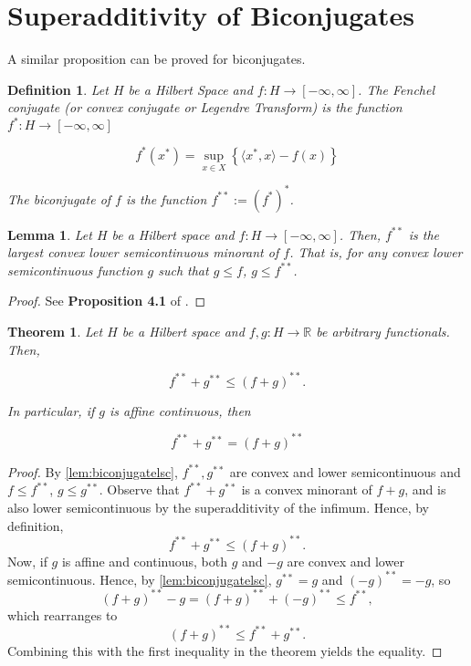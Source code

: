 \documentclass[11pt]{article}
\newtheorem{definition}{Definition}
\newtheorem{theorem}{Theorem}
\newtheorem{lemma}{Lemma}
\newcommand{\R}{\mathbb{R}}
\begin{document}
	
	\section{Superadditivity of Biconjugates}
	A similar proposition can be proved for biconjugates. 
	\begin{definition}
		Let $H$ be a Hilbert Space and $f:H\to[-\infty, \infty]$. The Fenchel conjugate (or convex conjugate or Legendre Transform) is the function $f^{*}:H\to[-\infty, \infty]$
		
		\[	f^{*}(x^*) = \sup_{x\in X} \left\{		\langle x^{*}, x\rangle - f(x)
													\right\}
				\]
		
		\noindent The biconjugate of $f$ is the function $f^{**} := (f^*)^*$.
		\end{definition}
	
	\begin{lemma}
		\label{lem:biconjugatelsc}
		Let $H$ be a Hilbert space and $f:H\to[-\infty, \infty]$. Then, $f^{**}$ is the largest convex lower semicontinuous minorant of $f$. That is, for any convex lower semicontinuous function $g$ such that $g\leq f$, $g\leq f^{**}$.
		\end{lemma}
	
	\begin{proof}
		See \textbf{Proposition 4.1} of \cite{Ekeland}.
		\end{proof}
	
	\begin{theorem}
		Let $H$ be a Hilbert space and $f,g:H\to\R$ be arbitrary functionals. Then, 
		
		\[	f^{**} + g^{**} \leq (f+g)^{**}.
		\]
		
		\noindent In particular, if $g$ is affine continuous, then 
		
		\[	f^{**} + g^{**} = (f+g)^{**}
		\]
	\end{theorem}
	
	\begin{proof}
		By \autoref{lem:biconjugatelsc}, $f^{**}, g^{**}$ are convex and lower semicontinuous and $f\leq f^{**}$, $g\leq g^{**}$. Observe that $f^{**} + g^{**}$ is a convex minorant of $f + g$, and is also lower semicontinuous by the superadditivity of the infimum. Hence, by definition, 
		\[	f^{**} + g^{**} \leq (f+g)^{**}.
				\]
		Now, if $g$ is affine and continuous, both $g$ and $-g$ are convex and lower semicontinuous. Hence, by \autoref{lem:biconjugatelsc}, $g^{**} = g$ and $(-g)^{**} = -g$, so
		\[	(f+g)^{**} - g = (f+g)^{**} + (-g)^{**}\leq f^{**},
				\]
		which rearranges to 
		\[	(f + g)^{**} \leq f^{**} + g^{**}.
				\]
		Combining this with the first inequality in the theorem yields the equality.
	\end{proof}
	
\end{document}
